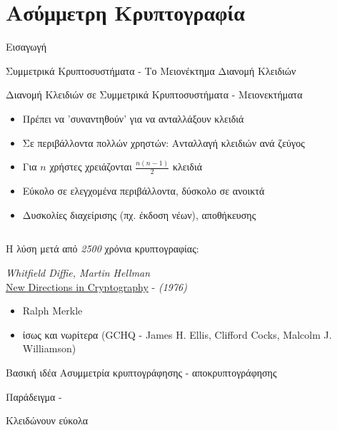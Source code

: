 \documentclass[handout]{beamer}
\begin{document}
\section{Ασύμμετρη Κρυπτογραφία}
\begin{frame}[allowframebreaks]{Εισαγωγή}
\begin{block}{Συμμετρικά Κρυπτοσυστήματα - \alert{Το Μειονέκτημα}}
Διανομή Κλειδιών
\end{block}

\begin{block}{Διανομή Κλειδιών σε Συμμετρικά Κρυπτοσυστήματα - Μειονεκτήματα}
\begin{itemize}
\item Πρέπει να 'συναντηθούν' για να ανταλλάξουν κλειδιά 
\item Σε περιβάλλοντα πολλών χρηστών: Ανταλλαγή κλειδιών ανά ζεύγος
\item Για $n$ χρήστες χρειάζονται $\frac{n(n-1)}{2}$ κλειδιά
\item Εύκολο σε ελεγχομένα περιβάλλοντα, δύσκολο σε ανοικτά
\item Δυσκολίες διαχείρισης (πχ. έκδοση νέων), αποθήκευσης
\end{itemize}
\end{block}

\framebreak

\begin{columns}
\begin{small}
Η λύση μετά από \emph{2500} χρόνια κρυπτογραφίας:  

\medskip

\emph{Whitfield Diffie, Martin Hellman}\\ \href{http://www-ee.stanford.edu/~hellman/publications/24.pdf}{New Directions in Cryptography} - \emph{(1976)}

\medskip
\begin{itemize}
\item Ralph Merkle
\item ίσως και νωρίτερα (GCHQ - James H. Ellis, Clifford Cocks, Malcolm J. Williamson)
\end{itemize}



\begin{block}{Βασική ιδέα}
Ασυμμετρία κρυπτογράφησης - αποκρυπτογράφησης
\end{block}

Παράδειγμα -  

Κλειδώνουν εύκολα


\end{small}
\end{columns}
\end{frame}
\end{document}

